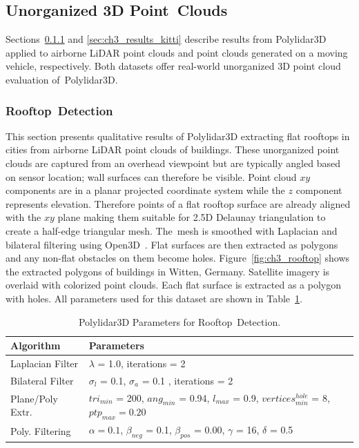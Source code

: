 \subsection{Unorganized 3D Point~Clouds}\label{sec:ch3_results_unorganized}

Sections~\ref{sec:ch3_results_rooftop} and \ref{sec:ch3_results_kitti} describe results from Polylidar3D applied to airborne LiDAR point clouds and point clouds generated on a moving vehicle, respectively.  Both datasets offer real-world unorganized 3D point cloud evaluation of~Polylidar3D.

\subsubsection{Rooftop~Detection} \label{sec:ch3_results_rooftop}


This section presents qualitative results of Polylidar3D extracting flat rooftops in cities from airborne LiDAR point clouds of buildings. These unorganized point clouds are captured from an overhead viewpoint but are typically angled based on sensor location; wall surfaces can therefore be visible. Point cloud $xy$ components are in a planar projected coordinate system while the $z$ component represents elevation. Therefore points of a flat rooftop surface are already aligned with the $xy$ plane making them suitable for 2.5D Delaunay triangulation to create a half-edge triangular mesh.  The~mesh is smoothed with Laplacian and bilateral filtering using Open3D~\cite{zhou_open3d_2018}. Flat surfaces are then extracted as polygons and any non-flat obstacles on them become holes. Figure~\ref{fig:ch3_rooftop} shows the extracted polygons of buildings in Witten, Germany. Satellite imagery is overlaid with colorized point clouds. %
Each flat surface is extracted as a polygon with holes. 
All parameters used for this dataset are shown in Table~\ref{table:rooftop_parameters}. 


\begin{table}[H]
\centering
\caption{Polylidar3D Parameters for Rooftop~Detection.}\label{table:rooftop_parameters}
\begin{tabular}{@{}ll@{}}
\toprule
\textbf{Algorithm}        & \textbf{Parameters}                                                          \\ \midrule
Laplacian Filter & $\lambda$ = 1.0, iterations = 2   \\
Bilateral Filter & $\sigma_l$ = 0.1, $\sigma_a$ = 0.1 , iterations = 2 \\
Plane/Poly Extr.      & $tri_{min}$ = 200, $ang_{min}$ = 0.94, $l_{max}$ = 0.9, $vertices^{hole}_{min}$ = 8, $ptp_{max} = 0.20$     \\
Poly. Filtering      & $\alpha = 0.1$, $\beta_{neg}$ = 0.1, $\beta_{pos}$ = 0.00, $\gamma$ = 16, $\delta$ = 0.5  \\ \bottomrule
\end{tabular}
\end{table}


